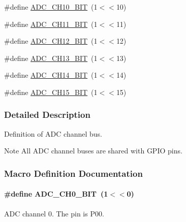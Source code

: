 \begin{DoxyCompactItemize}
\item 
\#define \hyperlink{group___a_d_c___c_h_a_n_n_e_l___d_e_f_gace3c1f30142e9f6402b3fb3aa620c63c}{A\+D\+C\+\_\+\+C\+H10\+\_\+\+B\+IT}~(1$<$$<$10)
\item 
\#define \hyperlink{group___a_d_c___c_h_a_n_n_e_l___d_e_f_ga5e03c7aaa3cd79df60f4519ae77088b3}{A\+D\+C\+\_\+\+C\+H11\+\_\+\+B\+IT}~(1$<$$<$11)
\item 
\#define \hyperlink{group___a_d_c___c_h_a_n_n_e_l___d_e_f_ga514e124e22b2acbb94091523a7896f0f}{A\+D\+C\+\_\+\+C\+H12\+\_\+\+B\+IT}~(1$<$$<$12)
\item 
\#define \hyperlink{group___a_d_c___c_h_a_n_n_e_l___d_e_f_gacefffd08c21593272f064a409a634943}{A\+D\+C\+\_\+\+C\+H13\+\_\+\+B\+IT}~(1$<$$<$13)
\item 
\#define \hyperlink{group___a_d_c___c_h_a_n_n_e_l___d_e_f_gad5dabe1471f5f30ede34ac337b66304b}{A\+D\+C\+\_\+\+C\+H14\+\_\+\+B\+IT}~(1$<$$<$14)
\item 
\#define \hyperlink{group___a_d_c___c_h_a_n_n_e_l___d_e_f_gaf80854bf836e1bda697d6e7275128eec}{A\+D\+C\+\_\+\+C\+H15\+\_\+\+B\+IT}~(1$<$$<$15)
\end{DoxyCompactItemize}


\subsubsection{Detailed Description}
Definition of A\+DC channel bus. 

\begin{DoxyNote}{Note}
All A\+DC channel buses are shared with G\+P\+IO pins. 
\end{DoxyNote}


\subsubsection{Macro Definition Documentation}
\paragraph[{\texorpdfstring{A\+D\+C\+\_\+\+C\+H0\+\_\+\+B\+IT}{ADC_CH0_BIT}}]{\setlength{\rightskip}{0pt plus 5cm}\#define A\+D\+C\+\_\+\+C\+H0\+\_\+\+B\+IT~(1$<$$<$0)}\hypertarget{group___a_d_c___c_h_a_n_n_e_l___d_e_f_ga0b7dad5dbe436841b0637f0fe7a62587}{}\label{group___a_d_c___c_h_a_n_n_e_l___d_e_f_ga0b7dad5dbe436841b0637f0fe7a62587}
A\+DC channel 0. The pin is P00. 
